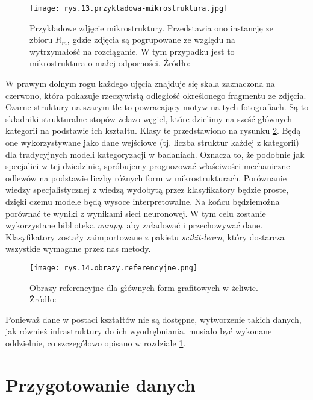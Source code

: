 \begin{figure}[h]
    \centering
    \texttt{[image: rys.13.przykladowa-mikrostruktura.jpg]}
    \caption{Przykładowe zdjęcie mikrostruktury. Przedstawia ono instancję ze zbioru $R_m$, gdzie zdjęcia są pogrupowane ze względu na wytrzymałość na rozciąganie. W tym przypadku jest to mikrostruktura o małej odporności. Żródło: \cite{Pirowski17}}
    \label{fig:mesh13}
\end{figure}
W prawym dolnym rogu każdego ujęcia znajduje się skala zaznaczona na czerwono, która pokazuje rzeczywistą odległość określonego fragmentu ze zdjęcia. Czarne struktury na szarym tle to powracający motyw na tych fotografiach. Są to składniki strukturalne stopów żelazo-węgiel, które dzielimy na sześć głównych kategorii na podstawie ich kształtu. Klasy te przedstawiono na rysunku \ref{fig:mesh14}. Będą one wykorzystywane jako dane wejściowe (tj. liczba struktur każdej z kategorii) dla tradycyjnych modeli kategoryzacji w badaniach. Oznacza to, że podobnie jak specjalici w tej dziedzinie, spróbujemy prognozować właściwości mechaniczne odlewów na podstawie liczby różnych form w mikrostrukturach. Porównanie wiedzy specjalistycznej z wiedzą wydobytą przez klasyfikatory będzie proste, dzięki czemu modele będą wysoce interpretowalne. Na końcu będziemożna porównać te wyniki z wynikami sieci neuronowej. W tym celu zostanie wykorzystane biblioteka \textit{numpy}, aby załadować i przechowywać dane. Klasyfikatory zostały zaimportowane z pakietu \textit{scikit-learn}, który dostarcza wszystkie wymagane przez nas metody. 
\begin{figure}[h]
    \centering
    \texttt{[image: rys.14.obrazy.referencyjne.png]}
    \caption{Obrazy referencyjne dla głównych form grafitowych w żeliwie. Żródło: \cite{norma}}
    \label{fig:mesh14}
\end{figure}
Ponieważ dane w postaci kształtów nie są dostępne, wytworzenie takich danych, jak również infrastruktury do ich wyodrębniania, musiało być wykonane oddzielnie, co szczegółowo opisano w rozdziale \ref{sec:przygotowanie_danych}.

\section{Przygotowanie danych}
\label{sec:przygotowanie_danych}

